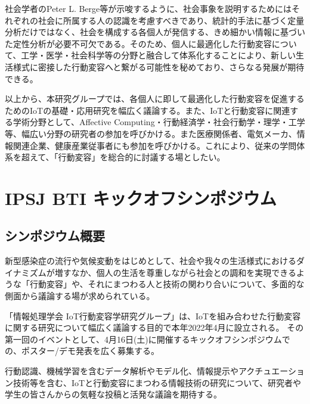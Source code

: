 \documentclass[a4paper,twocolumn,9pt]{jsarticle}
\begin{document}
社会学者のPeter L. Berge等が示唆するように、社会事象を説明するためにはそれぞれの社会に所属する人の認識を考慮すべきであり、統計的手法に基づく定量分析だけではなく、社会を構成する各個人が発信する、きめ細かい情報に基づいた定性分析が必要不可欠である。そのため、個人に最適化した行動変容について、工学・医学・社会科学等の分野と融合して体系化することにより、新しい生活様式に密接した行動変容へと繋がる可能性を秘めており、さらなる発展が期待できる。

以上から、本研究グループでは、各個人に即して最適化した行動変容を促進するためのIoTの基礎・応用研究を幅広く議論する。また、IoTと行動変容に関連する学術分野として、Affective Computing・行動経済学・社会行動学・理学・工学等、幅広い分野の研究者の参加を呼びかける。また医療関係者、電気メーカ、情報関連企業、健康産業従事者にも参加を呼びかける。これにより、従来の学問体系を超えて、「行動変容」を総合的に討議する場としたい。



\section{IPSJ BTI キックオフシンポジウム}
\label{sec:symposium}

\subsection{シンポジウム概要}

新型感染症の流行や気候変動をはじめとして、社会や我々の生活様式におけるダイナミズムが増すなか、個人の生活を尊重しながら社会との調和を実現できるような「行動変容」や、それにまつわる人と技術の関わり合いについて、多面的な側面から議論する場が求められている。

「情報処理学会 IoT行動変容学研究グループ」は、IoTを組み合わせた行動変容に関する研究について幅広く議論する目的で本年2022年4月に設立される。
その第一回のイベントとして、4月16日(土)に開催するキックオフシンポジウムでの、ポスター/デモ発表を広く募集する。

行動認識、機械学習を含むデータ解析やモデル化、情報提示やアクチュエーション技術等を含む、IoTと行動変容にまつわる情報技術の研究について、研究者や学生の皆さんからの気軽な投稿と活発な議論を期待する。
\end{document}
